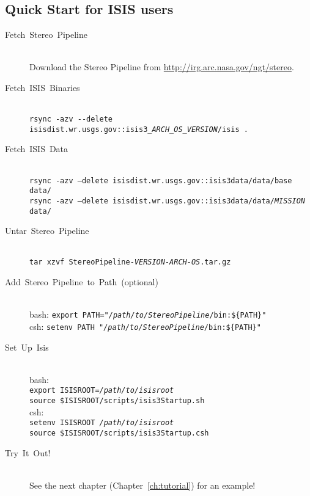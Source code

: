 \subsection{Quick Start for ISIS users}
\begin{description}

\item[{Fetch~Stereo~Pipeline}] ~\\
Download the Stereo Pipeline from \url{http://irg.arc.nasa.gov/ngt/stereo}.

\item [{Fetch~ISIS~Binaries}] ~\\
\texttt{rsync -azv -\/-delete isisdist.wr.usgs.gov::isis3\_\textit{ARCH\_OS\_VERSION}/isis .}

\item [{Fetch~ISIS~Data}] ~\\
\texttt{rsync -azv --delete isisdist.wr.usgs.gov::isis3data/data/base data/}\\
\texttt{rsync -azv --delete isisdist.wr.usgs.gov::isis3data/data/\textit{MISSION} data/}

\item [{Untar~Stereo~Pipeline}] ~\\
\texttt{tar xzvf StereoPipeline-\textit{VERSION-ARCH-OS}.tar.gz}

\item [{Add~Stereo~Pipeline~to~Path~(optional)}] ~\\
bash: \texttt{export PATH="\textit{/path/to/StereoPipeline}/bin:\$\{PATH\}"} \\
csh:  \texttt{setenv PATH "\textit{/path/to/StereoPipeline}/bin:\$\{PATH\}"}

\item[Set~Up~Isis] ~\\
bash: \\
\hspace*{2em}\texttt{export ISISROOT=\textit{/path/to/isisroot}} \\
\hspace*{2em}\texttt{source \$ISISROOT/scripts/isis3Startup.sh} \\
csh: \\
\hspace*{2em}\texttt{setenv ISISROOT \textit{/path/to/isisroot}} \\
\hspace*{2em}\texttt{source \$ISISROOT/scripts/isis3Startup.csh}

\item [{Try~It~Out!}] ~\\
See the next chapter (Chapter~\ref{ch:tutorial}) for an example!
\end{description}

